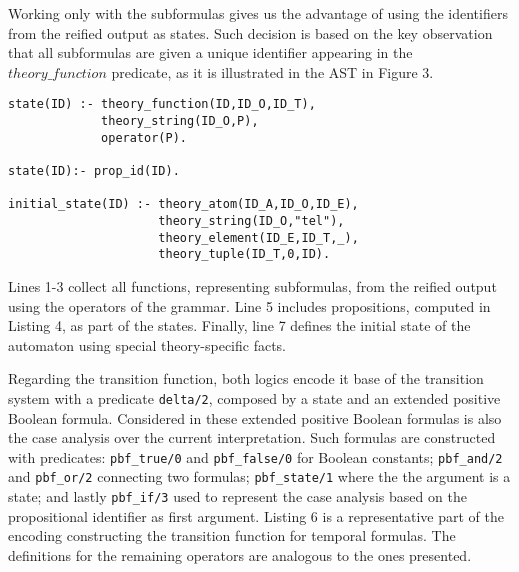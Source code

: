 Working only with the subformulas gives us the advantage of using the identifiers from the reified output as states. Such decision is based on the key observation that all subformulas are given a unique identifier appearing in the $theory\_function$ predicate, as it is illustrated in the AST in Figure 3. 


\begin{center}
    \begin{lstlisting}[] 
state(ID) :- theory_function(ID,ID_O,ID_T),
             theory_string(ID_O,P), 
             operator(P).

state(ID):- prop_id(ID).

initial_state(ID) :- theory_atom(ID_A,ID_O,ID_E),
                     theory_string(ID_O,"tel"),
                     theory_element(ID_E,ID_T,_),
                     theory_tuple(ID_T,0,ID).
    \end{lstlisting}
\end{center}

Lines 1-3 collect all functions, representing subformulas, from the reified output using the operators of the grammar. Line 5 includes propositions, computed in Listing 4, as part of the states. Finally, line 7 defines the initial state of the automaton using special theory-specific facts. 

Regarding the transition function, both logics encode it base of the transition system with a predicate \texttt{delta/2}, composed by a state and an extended positive Boolean formula. Considered in these extended positive Boolean formulas is also the case analysis over the current interpretation. 
Such formulas are constructed with predicates: \texttt{pbf\_true/0} and \texttt{pbf\_false/0} for Boolean constants; \texttt{pbf\_and/2} and \texttt{pbf\_or/2} connecting two formulas; \texttt{pbf\_state/1} where the the argument is a state; and lastly \texttt{pbf\_if/3} used to represent the case analysis based on the propositional identifier as first argument. Listing 6 is a representative part of the encoding constructing the transition function for temporal formulas. The definitions for the remaining operators are analogous to the ones presented. 

